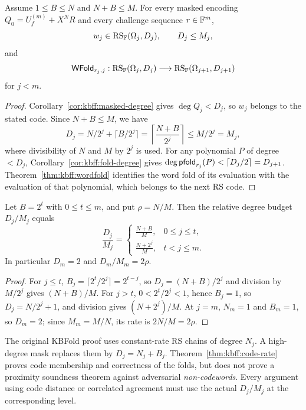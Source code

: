 \begin{theorem}\label{thm:kbff:code-rate}
Assume $1\leq B\leq N$ and $N+B\leq M$.
For every masked encoding $Q_0=U_f^{(m)}+X^NR$ and every challenge
sequence $r\in\mathbb{F}^m$,
\[
 w_j\in\operatorname{RS}_{\mathbb{F}}(\Omega_j,D_j),\qquad
 D_j\leq M_j,
\]
and
\[
 \mathsf{WFold}_{r_j,j}:
   \operatorname{RS}_{\mathbb{F}}(\Omega_j,D_j)
   \longrightarrow\operatorname{RS}_{\mathbb{F}}(\Omega_{j+1},D_{j+1})
\]
for $j<m$.
\end{theorem}
\begin{proof}
Corollary~\ref{cor:kbff:masked-degree} gives $\deg Q_j<D_j$,
so $w_j$ belongs to the stated code. Since $N+B\leq M$,
we have
\[
 D_j=N/2^j+\lceil B/2^j\rceil
 =\left\lceil\frac{N+B}{2^j}\right\rceil
 \leq M/2^j=M_j,
\]
where divisibility of $N$ and $M$ by $2^j$ is used.
For any polynomial $P$ of degree $<D_j$,
Corollary~\ref{cor:kbff:fold-degree} gives
$\deg\mathsf{pfold}_{r_j}(P)<\lceil D_j/2\rceil=D_{j+1}$.
Theorem~\ref{thm:kbff:wordfold} identifies the word fold of its
evaluation with the evaluation of that polynomial, which belongs
to the next RS code.
\end{proof}

\begin{corollary}\label{cor:kbff:rate-transition}
Let $B=2^t$ with $0\leq t\leq m$, and put $\rho=N/M$.
Then the relative degree budget $D_j/M_j$ equals
\[
 \frac{D_j}{M_j}=
 \begin{cases}
 \displaystyle\frac{N+B}{M},&0\leq j\leq t,\\[3pt]
 \displaystyle\frac{N+2^j}{M},&t<j\leq m.
 \end{cases}
\]
In particular $D_m=2$ and $D_m/M_m=2\rho$.
\end{corollary}
\begin{proof}
For $j\leq t$, $B_j=\lceil2^t/2^j\rceil=2^{t-j}$,
so $D_j=(N+B)/2^j$ and division by $M/2^j$ gives
$(N+B)/M$.
For $j>t$, $0<2^t/2^j<1$, hence $B_j=1$, so
$D_j=N/2^j+1$, and division gives $(N+2^j)/M$.
At $j=m$, $N_m=1$ and $B_m=1$, so $D_m=2$; since $M_m=M/N$,
its rate is $2N/M=2\rho$.
\end{proof}

\begin{remark}
The original KBFold proof uses constant-rate RS chains of degree
$N_j$. A high-degree mask replaces them by $D_j=N_j+B_j$.
Theorem~\ref{thm:kbff:code-rate} proves code membership and
correctness of the folds, but does not prove a proximity soundness
theorem against adversarial \emph{non-codewords}. Every argument
using code distance or correlated agreement must use the actual
$D_j/M_j$ at the corresponding level.
\end{remark}
